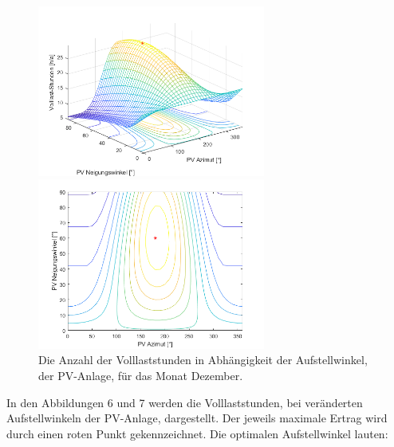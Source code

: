 \documentclass[a4paper,12pt]{article}
\begin{document}
	\begin{figure}[H]
		\centering
		\begin{minipage}[b]{0.4\textwidth}
			\centering
			\includegraphics[width=7.5cm]{img/results/VolllaststundenAbhaengigVomWinkelDezember}
		\end{minipage}
		\hfill
		\begin{minipage}[b]{0.4\textwidth}
			\centering
			\includegraphics[width=7.5cm]{img/results/VolllaststundenAbhaengigVomWinkelContourDezember}
		\end{minipage}
		\caption{Die Anzahl der Volllaststunden in Abhängigkeit der Aufstellwinkel, der PV-Anlage, für das Monat Dezember.}
	\end{figure}
	In den Abbildungen 6 und 7 werden die Volllaststunden, bei veränderten Aufstellwinkeln der PV-Anlage, dargestellt. Der jeweils maximale Ertrag wird durch einen roten Punkt gekennzeichnet.\newline
	Die optimalen Aufstellwinkel lauten:
\end{document}
